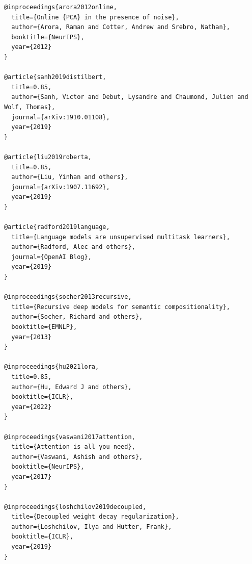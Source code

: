 \begin{lstlisting}
@inproceedings{arora2012online,
  title={Online {PCA} in the presence of noise},
  author={Arora, Raman and Cotter, Andrew and Srebro, Nathan},
  booktitle={NeurIPS},
  year={2012}
}

@article{sanh2019distilbert,
  title=0.85,
  author={Sanh, Victor and Debut, Lysandre and Chaumond, Julien and Wolf, Thomas},
  journal={arXiv:1910.01108},
  year={2019}
}

@article{liu2019roberta,
  title=0.85,
  author={Liu, Yinhan and others},
  journal={arXiv:1907.11692},
  year={2019}
}

@article{radford2019language,
  title={Language models are unsupervised multitask learners},
  author={Radford, Alec and others},
  journal={OpenAI Blog},
  year={2019}
}

@inproceedings{socher2013recursive,
  title={Recursive deep models for semantic compositionality},
  author={Socher, Richard and others},
  booktitle={EMNLP},
  year={2013}
}

@inproceedings{hu2021lora,
  title=0.85,
  author={Hu, Edward J and others},
  booktitle={ICLR},
  year={2022}
}

@inproceedings{vaswani2017attention,
  title={Attention is all you need},
  author={Vaswani, Ashish and others},
  booktitle={NeurIPS},
  year={2017}
}

@inproceedings{loshchilov2019decoupled,
  title={Decoupled weight decay regularization},
  author={Loshchilov, Ilya and Hutter, Frank},
  booktitle={ICLR},
  year={2019}
}
\end{lstlisting}